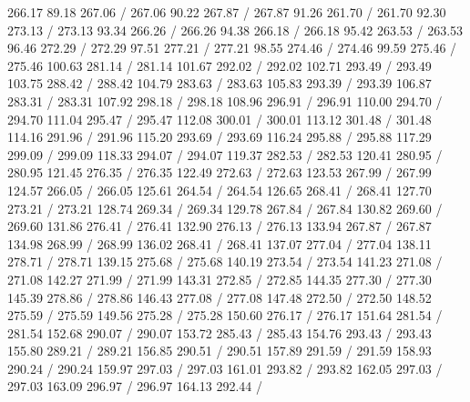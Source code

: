 { 266.17 89.18 267.06 /
 267.06 90.22 267.87 /
 267.87 91.26 261.70 /
 261.70 92.30 273.13 /
 273.13 93.34 266.26 /
 266.26 94.38 266.18 /
 266.18 95.42 263.53 /
 263.53 96.46 272.29 /
 272.29 97.51 277.21 /
 277.21 98.55 274.46 /
 274.46 99.59 275.46 /
 275.46 100.63 281.14 /
 281.14 101.67 292.02 /
 292.02 102.71 293.49 /
 293.49 103.75 288.42 /
 288.42 104.79 283.63 /
 283.63 105.83 293.39 /
 293.39 106.87 283.31 /
 283.31 107.92 298.18 /
 298.18 108.96 296.91 /
 296.91 110.00 294.70 /
 294.70 111.04 295.47 /
 295.47 112.08 300.01 /
 300.01 113.12 301.48 /
 301.48 114.16 291.96 /
 291.96 115.20 293.69 /
 293.69 116.24 295.88 /
 295.88 117.29 299.09 /
 299.09 118.33 294.07 /
 294.07 119.37 282.53 /
 282.53 120.41 280.95 /
 280.95 121.45 276.35 /
 276.35 122.49 272.63 /
 272.63 123.53 267.99 /
 267.99 124.57 266.05 /
 266.05 125.61 264.54 /
 264.54 126.65 268.41 /
 268.41 127.70 273.21 /
 273.21 128.74 269.34 /
 269.34 129.78 267.84 /
 267.84 130.82 269.60 /
 269.60 131.86 276.41 /
 276.41 132.90 276.13 /
 276.13 133.94 267.87 /
 267.87 134.98 268.99 /
 268.99 136.02 268.41 /
 268.41 137.07 277.04 /
 277.04 138.11 278.71 /
 278.71 139.15 275.68 /
 275.68 140.19 273.54 /
 273.54 141.23 271.08 /
 271.08 142.27 271.99 /
 271.99 143.31 272.85 /
 272.85 144.35 277.30 /
 277.30 145.39 278.86 /
 278.86 146.43 277.08 /
 277.08 147.48 272.50 /
 272.50 148.52 275.59 /
 275.59 149.56 275.28 /
 275.28 150.60 276.17 /
 276.17 151.64 281.54 /
 281.54 152.68 290.07 /
 290.07 153.72 285.43 /
 285.43 154.76 293.43 /
 293.43 155.80 289.21 /
 289.21 156.85 290.51 /
 290.51 157.89 291.59 /
 291.59 158.93 290.24 /
 290.24 159.97 297.03 /
 297.03 161.01 293.82 /
 293.82 162.05 297.03 /
 297.03 163.09 296.97 /
 296.97 164.13 292.44 /
}
